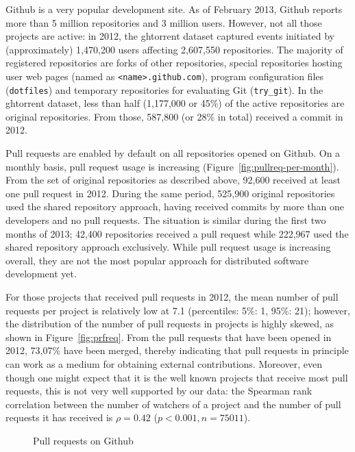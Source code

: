 \documentclass{acm_proc_article-sp}
\begin{document}
Github is a very popular development site. As of February 2013, Github reports
more than 5 million repositories and 3 million users. However, not all those
projects are active: in 2012, the {\sc ght}orrent dataset captured events initiated by
(approximately) 1,470,200 users affecting 2,607,550 repositories. The majority
of registered repositories are forks of other repositories, special repositories
hosting user web pages (named as \texttt{<name>.github.com}), program
configuration files (\texttt{dotfiles}) and temporary repositories for
evaluating Git (\texttt{try\_git}). In the {\sc ght}orrent dataset, less than half
(1,177,000 or 45\%) of the active repositories are original repositories. From
those, 587,800 (or 28\% in total) received a commit in 2012.

Pull requests are enabled by default on all repositories opened on Github. On a
monthly basis, pull request usage is increasing
(Figure~\ref{fig:pullreq-per-month}). From the set of original repositories as
described above, 92,600 received at least one pull request in 2012. During the
same period, 525,900 original repositories used the shared repository approach,
having received commits by more than one developers and no pull requests. The
situation is similar during the first two months of 2013; 42,400 repositories
received a pull request while 222,967 used the shared repository approach
exclusively. While pull request usage is increasing overall, they are not the
most popular approach for distributed software development yet.

For those projects that received pull requests in 2012, the mean number of pull
requests per project is relatively low at 7.1 (percentiles: 5\%: 1, 95\%: 21);
however, the distribution of the number of pull requests in projects is highly skewed, as
shown in Figure~\ref{fig:prfreq}.
From the pull requests that have been opened in 2012, 73,07\% have been merged,
thereby indicating that pull requests in principle can work as a medium for
obtaining external contributions. Moreover, even though one might expect that it
is the well known projects that receive most pull requests, this is not very
well supported by our data: the Spearman rank correlation between the number of
watchers of a project and the number of pull requests it has received is $\rho = 0.42$
($p < 0.001, n = 75011$).

\begin{figure}[t]
  \centering
{}
\caption{Pull requests on Github}
\end{figure}
\end{document}
